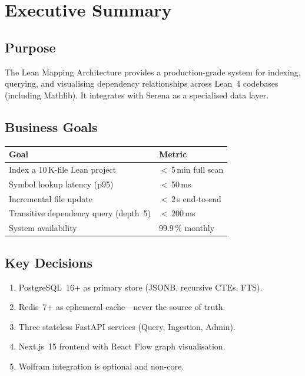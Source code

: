 \chapter{Executive Summary}

\section{Purpose}
The Lean Mapping Architecture provides a production-grade system for indexing,
querying, and visualising dependency relationships across Lean~4 codebases
(including Mathlib).  It integrates with Serena as a specialised data layer.

\section{Business Goals}

\begin{table}[h]
\centering
\begin{tabular}{@{}ll@{}}
\toprule
\textbf{Goal} & \textbf{Metric} \\
\midrule
Index a 10\,K-file Lean project & $<$\,5\,min full scan \\
Symbol lookup latency (p95) & $<$\,50\,ms \\
Incremental file update & $<$\,2\,s end-to-end \\
Transitive dependency query (depth~5) & $<$\,200\,ms \\
System availability & 99.9\,\% monthly \\
\bottomrule
\end{tabular}
\end{table}

\section{Key Decisions}
\begin{enumerate}
  \item PostgreSQL~16+ as primary store (JSONB, recursive CTEs, FTS).
  \item Redis~7+ as ephemeral cache---never the source of truth.
  \item Three stateless FastAPI services (Query, Ingestion, Admin).
  \item Next.js~15 frontend with React Flow graph visualisation.
  \item Wolfram integration is optional and non-core.
\end{enumerate}

